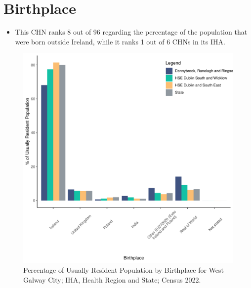 \documentclass{article}
\begin{document}
\section{Birthplace}\label{sect:Birth}
\begin{itemize}
\item This CHN ranks  8 out of 96 regarding the percentage of the population that were born outside Ireland, while it ranks  1 out of 6 CHNs in its IHA.
\end{itemize}
\begin{figure}[H]
	\centering
	\includegraphics[width = 130mm]{../figures/BirthED.pdf}
	\caption{Percentage of Usually Resident Population by Birthplace for West Galway City; IHA, Health Region and State; Census 2022.}
	\label{fig:vbnv}
	\end{figure}
	
\end{document}
